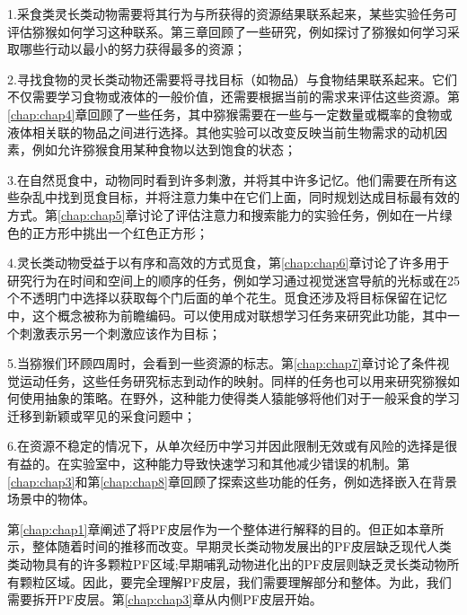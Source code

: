 1.采食类灵长类动物需要将其行为与所获得的资源结果联系起来，某些实验任务可评估猕猴如何学习这种联系。第三章回顾了一些研究，例如探讨了猕猴如何学习采取哪些行动以最小的努力获得最多的资源；\par
2.寻找食物的灵长类动物还需要将寻找目标（如物品）与食物结果联系起来。它们不仅需要学习食物或液体的一般价值，还需要根据当前的需求来评估这些资源。第\ref{chap:chap4}章回顾了一些任务，其中猕猴需要在一些与一定数量或概率的食物或液体相关联的物品之间进行选择。其他实验可以改变反映当前生物需求的动机因素，例如允许猕猴食用某种食物以达到饱食的状态；\par
3.在自然觅食中，动物同时看到许多刺激，并将其中许多记忆。他们需要在所有这些杂乱中找到觅食目标，并将注意力集中在它们上面，同时规划达成目标最有效的方式。第\ref{chap:chap5}章讨论了评估注意力和搜索能力的实验任务，例如在一片绿色的正方形中挑出一个红色正方形；\par
4.灵长类动物受益于以有序和高效的方式觅食，第\ref{chap:chap6}章讨论了许多用于研究行为在时间和空间上的顺序的任务，例如学习通过视觉迷宫导航的光标或在25个不透明门中选择以获取每个门后面的单个花生。觅食还涉及将目标保留在记忆中，这个概念被称为前瞻编码。可以使用成对联想学习任务来研究此功能，其中一个刺激表示另一个刺激应该作为目标；\par
5.当猕猴们环顾四周时，会看到一些资源的标志。第\ref{chap:chap7}章讨论了条件视觉运动任务，这些任务研究标志到动作的映射。同样的任务也可以用来研究猕猴如何使用抽象的策略。在野外，这种能力使得类人猿能够将他们对于一般采食的学习迁移到新颖或罕见的采食问题中；\par
6.在资源不稳定的情况下，从单次经历中学习并因此限制无效或有风险的选择是很有益的。在实验室中，这种能力导致快速学习和其他减少错误的机制。第\ref{chap:chap3}和第\ref{chap:chap8}章回顾了探索这些功能的任务，例如选择嵌入在背景场景中的物体。

第\ref{chap:chap1}章阐述了将PF皮层作为一个整体进行解释的目的。但正如本章所示，整体随着时间的推移而改变。早期灵长类动物发展出的PF皮层缺乏现代人类类动物具有的许多颗粒PF区域;早期哺乳动物进化出的PF皮层则缺乏灵长类动物所有颗粒区域。因此，要完全理解PF皮层，我们需要理解部分和整体。为此，我们需要拆开PF皮层。第\ref{chap:chap3}章从内侧PF皮层开始。